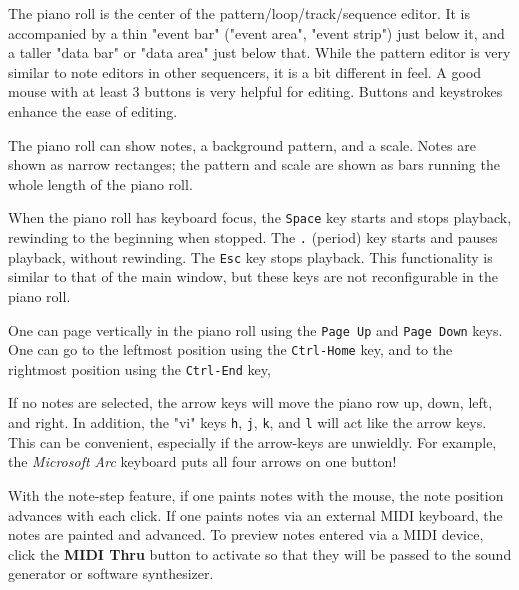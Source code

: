    The piano roll is the center of the pattern/loop/track/sequence editor.
   It is accompanied by a thin "event bar" ("event area", "event strip")
   just below it,
   and a taller "data bar" or "data area" just below that.
   While the pattern
   editor is very similar to note editors in other sequencers, it is a bit
   different in feel.  A good mouse with at least 3 buttons is very helpful
   for editing.  Buttons and keystrokes enhance the ease of editing.

   The piano roll can show notes, a background pattern, and a scale.
   Notes are shown as narrow rectanges; the pattern and scale are
   shown as bars running the whole length of the piano roll.

   When the piano roll has keyboard focus, the \texttt{Space} key
   starts and stops playback, rewinding to the beginning when stopped.
   The \texttt{.} (period) key starts and pauses playback, without
   rewinding.
   The \texttt{Esc} key stops playback.
   This functionality is similar to that of the main window, but
   these keys are not reconfigurable in the piano roll.

   One can page vertically in the piano roll using the
    \texttt{Page Up} and 
    \texttt{Page Down} keys.
   One can go to the leftmost position using the 
    \texttt{Ctrl-Home} key,
   and to the rightmost position using the
    \texttt{Ctrl-End} key,

   If no notes are selected, the arrow keys will move the piano row up, down,
   left, and right.
   In addition, the "vi" keys \texttt{h}, \texttt{j}, \texttt{k}, and
   \texttt{l} will act like the arrow keys. This can be convenient, especially
   if the arrow-keys are unwieldly.  For example, the
   \textsl{Microsoft Arc} keyboard puts all four arrows on one button!

   With the note-step feature, if one paints notes with the mouse,
   the note position advances with each click.
   If one paints notes via an external MIDI keyboard, the notes are painted and
   advanced.
   To preview notes entered via a MIDI device, click the
   \textbf{MIDI Thru} button to activate so that they will be
   passed to the sound generator or software synthesizer.

